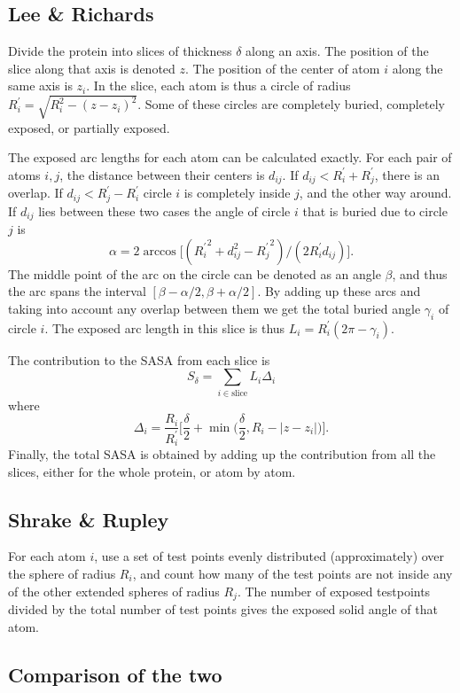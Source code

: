 \documentclass[a4paper,11pt]{article}
\begin{document}
\subsection{Lee \& Richards}

Divide the protein into slices of thickness $\delta$ along an
axis. The position of the slice along that axis is denoted $z$. The
position of the center of atom $i$ along the same axis is $z_i$. In
the slice, each atom is thus a circle of radius $R_i^\prime =
\sqrt{R_i^2-(z-z_i)^2}$. Some of these circles are completely buried,
completely exposed, or partially exposed.

The exposed arc lengths for each atom can be calculated exactly. For
each pair of atoms $i,j$, the distance between their centers is
$d_{ij}$. If $d_{ij} < R_i^\prime + R_j^\prime$, there is an
overlap. If $d_{ij} < R_j^\prime - R_i^\prime$ circle $i$ is
completely inside $j$, and the other way around. If $d_{ij}$ lies
between these two cases the angle of circle $i$ that is buried due to
circle $j$ is $$\alpha = 2\arccos \bigl[({R_i^\prime}^2 + d_{ij}^2 -
  {R_{j}^\prime}^2)/(2R_i^\prime d_{ij})\bigr].$$ The middle point of
the arc on the circle can be denoted as an angle $\beta$, and thus the
arc spans the interval $[\beta-\alpha/2,\beta+\alpha/2]$. By adding up
these arcs and taking into account any overlap between them we get
the total buried angle $\gamma_i$ of circle $i$. The exposed arc length in
this slice is thus $L_i = R_i^\prime(2\pi-\gamma_i)$.

The contribution to the SASA from each slice is $$ S_\delta =
\sum_{i \in \text{slice}}L_i\Delta_i $$ where
$$
  \Delta_i = \frac{R_i}{R_i^\prime} \biggl[\frac{\delta}{2} 
    + \min\biggl(\frac{\delta}{2},R_i -
    \lvert z - z_i \rvert\biggr)\biggr]. 
$$ 
Finally, the total SASA is obtained by adding up the contribution from
all the slices, either for the whole protein, or atom by atom.

\subsection{Shrake \& Rupley}

For each atom $i$, use a set of test points evenly distributed
(approximately) over the sphere of radius $R_i$, and count how many of
the test points are not inside any of the other extended spheres of
radius $R_j$. The number of exposed testpoints divided by the total
number of test points gives the exposed solid angle of that atom.

\subsection{Comparison of the two}
\end{document}
